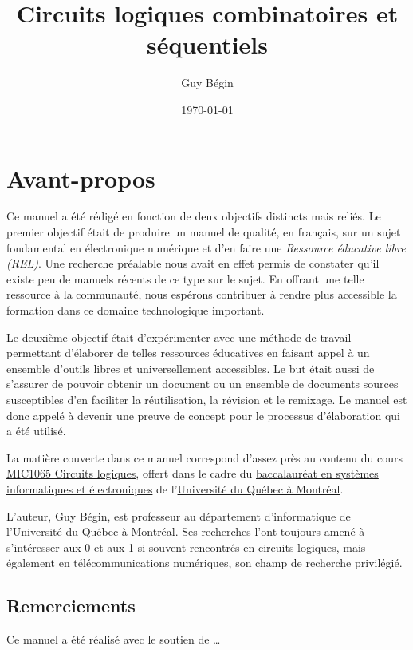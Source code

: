 \documentclass[11pt]{article}
\author{Guy Bégin}
\date{\today}
\title{Circuits logiques combinatoires et séquentiels}
\begin{document}
\maketitle

\section*{Avant-propos}
\label{sec:orgb49b12e}
Ce manuel a été rédigé en fonction de deux objectifs distincts mais
reliés. Le premier objectif était de produire un manuel de qualité, en
français, sur un sujet fondamental en électronique numérique et d'en
faire une \emph{Ressource éducative libre (REL)}. Une recherche préalable
nous avait en effet permis de constater qu'il existe peu de manuels
récents de ce type sur le sujet. En offrant une telle ressource à la
communauté, nous espérons contribuer à rendre plus accessible la
formation dans ce domaine technologique important.

Le deuxième objectif était d'expérimenter avec une méthode de
travail permettant d'élaborer de telles ressources éducatives en
faisant appel à un ensemble d'outils libres et universellement accessibles. Le
but était aussi de s'assurer de pouvoir obtenir un document ou un ensemble de
documents sources susceptibles d'en faciliter la réutilisation, la
révision et le remixage. Le manuel est donc appelé à devenir une
preuve de concept pour le processus d'élaboration qui a été utilisé.

La matière couverte dans ce manuel correspond d'assez près au contenu
du cours \href{https://etudier.uqam.ca/cours?sigle=MIC1065}{MIC1065 Circuits logiques}, offert dans le cadre du
\href{https://etudier.uqam.ca/programme?code=6526}{baccalauréat en systèmes informatiques et électroniques} de
l'\href{https://uqam.ca/}{Université du Québec à Montréal}. 

L'auteur, Guy Bégin, est professeur au département d'informatique de
l'Université du Québec à Montréal. Ses recherches l'ont toujours amené
à s'intéresser aux 0 et aux 1 si souvent rencontrés en circuits
logiques, mais également en télécommunications numériques, son champ
de recherche privilégié.

\subsection*{Remerciements}
\label{sec:orgbfc780f}

Ce manuel a été réalisé avec le soutien de \ldots{}
\end{document}

